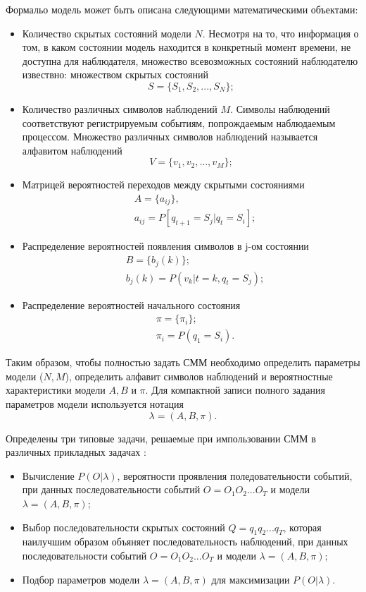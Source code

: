 Формальо модель может быть описана следующими математическими объектами:
\begin{itemize}
	\item
	Количество скрытых состояний модели \(N\). Несмотря на то, что информация о том, в каком состоянии модель находится в конкретный момент времени, не доступна для наблюдателя, множество всевозможных состояний наблюдателю извествно:
	множеством скрытых состояний
	\[ S = \{ S_1, S_2, ..., S_N \};\]
	\item
	Количество различных символов наблюдений \(M\). Символы наблюдений соответствуют регистрируемым событиям, попрождаемым наблюдаемым процессом. Множество различных символов наблюдений называется алфавитом наблюдений
	\[ V = \{ v_1, v_2, ..., v_M \};\]
	\item
	Матрицей вероятностей переходов между скрытыми состояниями
	\begin{align} 
		&A = \{ a_{ij} \}, \nonumber \\
		&a_{ij} = P[q_{t + 1} = S_j | q_t = S_i]; \nonumber
	\end{align}
	\item
	Распределение вероятностей появления символов в j-ом состоянии
	\begin{align}
		&B = \{ b_j(k) \}; \nonumber \\ 
		&b_j(k) = P(v_k | t = k, q_t = S_j); \nonumber
	\end{align}
	\item
	Распределение вероятностей начального состояния
	\begin{align}
		&\pi = \{\pi_i\}; \nonumber \\
		&\pi_i = P(q_1 = S_i). \nonumber
	\end{align}
\end{itemize}

Таким образом, чтобы полностью задать СММ необходимо определить параметры модели (\(N, M\)), определить алфавит символов наблюдений и вероятностные характеристики модели \(A, B\) и \(\pi\). Для компактной записи полного задания параметров модели используется нотация
\[\lambda = (A, B, \pi).\]

Определены три типовые задачи, решаемые при импользовании СММ в различных прикладных задачах \cite{Rabiner89atutorial}:
\begin{itemize}
	\item
	Вычисление \(P(O|\lambda)\), вероятности проявления поледовательности событий, при данных последовательности событий \(O=O_1O_2...O_T\) и модели \(\lambda = (A, B, \pi)\);
	\item
	Выбор последовательности скрытых состояний \(Q=q_1q_2...q_T\), которая наилучшим образом объяняет последовательность наблюдений, при данных последовательности событий \(O=O_1O_2...O_T\) и модели \(\lambda = (A, B, \pi)\);
	\item
	Подбор параметров модели \(\lambda = (A, B, \pi)\) для максимизации \(P(O|\lambda)\).
\end{itemize} 

